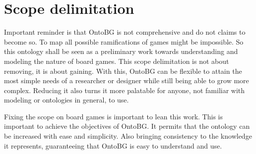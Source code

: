 \section{Scope delimitation} 

Important reminder is that OntoBG is not comprehensive and do not claims to become so. To map all possible ramifications of games might be impossible. So this ontology shall be seen as a preliminary work towards understanding and modeling the nature of board games. This scope delimitation is not about removing, it is about gaining. With this, OntoBG can be flexible to attain the most simple needs of a researcher or designer while still being able to grow more complex. Reducing it also turns it more palatable for anyone, not familiar with modeling or ontologies in general, to use.

Fixing the scope on board games is important to lean this work. This is important to achieve the objectives of OntoBG. It permits that the ontology can be increased with ease and simplicity. Also bringing consistency to the knowledge it represents, guaranteeing that OntoBG is easy to understand and use.